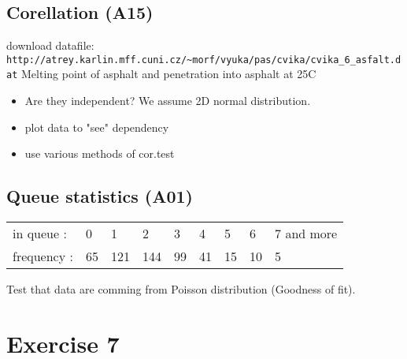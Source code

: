 \documentclass[4pt]{article}
\begin{document}
\subsection{Corellation (A15)}
download datafile: \verb'http://atrey.karlin.mff.cuni.cz/~morf/vyuka/pas/cvika/cvika_6_asfalt.dat'
Melting point of asphalt and penetration into asphalt at 25\textdegree C

\begin{itemize}
 \item Are they independent? We assume 2D normal distribution.

 \item plot data to "see" dependency
 \item use various methods of cor.test
\end{itemize}


\subsection{Queue statistics (A01)}

\begin{tabular}{lllllllll}
in queue        : &0  &1   &2   &3  &4  &5  &6  &7 and more\\
frequency       : &65 &121 &144 &99 &41 &15 &10 &5
\end{tabular}
Test that data are comming from Poisson distribution (Goodness of fit).





\noindent
\pagebreak


\section{Exercise 7}

%
%  
%
%
%
%
%
%
%
\end{document}

